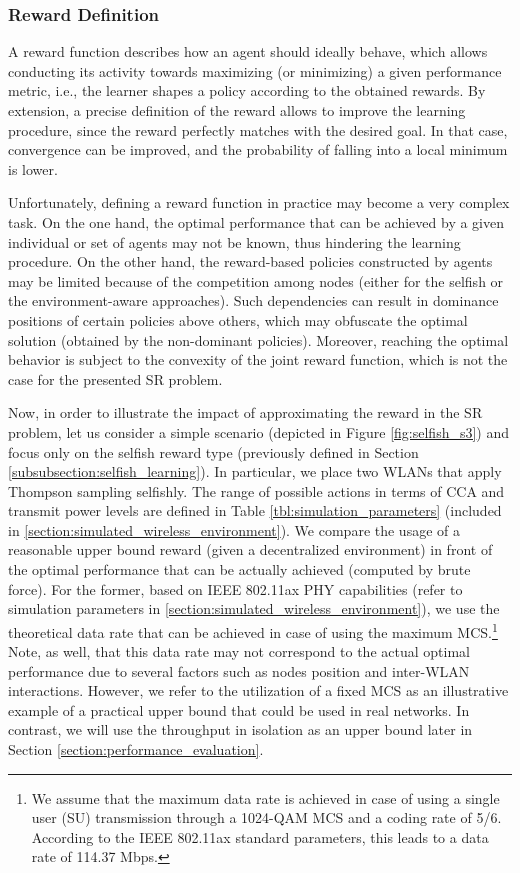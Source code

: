 \documentclass{article}
\begin{document}
\subsubsection{Reward Definition}
\label{subsubsection:reward}
A reward function describes how an agent should ideally behave, which allows conducting its activity towards maximizing (or minimizing) a given performance metric, i.e., the learner shapes a policy according to the obtained rewards. By extension, a precise definition of the reward allows to improve the learning procedure, since the reward perfectly matches with the desired goal. In that case, convergence can be improved, and the probability of falling into a local minimum is lower. 

Unfortunately, defining a reward function in practice may become a very complex task. On the one hand, the optimal performance that can be achieved by a given individual or set of agents may not be known, thus hindering the learning procedure. On the other hand, the reward-based policies constructed by agents may be limited because of the competition among nodes (either for the selfish or the environment-aware approaches). Such dependencies can result in dominance positions of certain policies above others, which may obfuscate the optimal solution (obtained by the non-dominant policies). Moreover, reaching the optimal behavior is subject to the convexity of the joint reward function, which is not the case for the presented SR problem.

Now, in order to illustrate the impact of approximating the reward in the SR problem, let us consider a simple scenario (depicted in Figure \ref{fig:selfish_s3}) and focus only on the selfish reward type (previously defined in Section \ref{subsubsection:selfish_learning}). In particular, we place two WLANs that apply Thompson sampling selfishly. The range of possible actions in terms of CCA and transmit power levels are defined in Table \ref{tbl:simulation_parameters} (included in \ref{section:simulated_wireless_environment}). We compare the usage of a reasonable upper bound reward (given a decentralized environment) in front of the optimal performance that can be actually achieved (computed by brute force). For the former, based on IEEE 802.11ax PHY capabilities (refer to simulation parameters in \ref{section:simulated_wireless_environment}), we use the theoretical data rate that can be achieved in case of using the maximum MCS.\footnote{We assume that the maximum data rate is achieved in case of using a single user (SU) transmission through a 1024-QAM MCS and a coding rate of 5/6. According to the IEEE 802.11ax standard parameters, this leads to a data rate of 114.37 Mbps.} Note, as well, that this data rate may not correspond to the actual optimal performance due to several factors such as nodes position and inter-WLAN interactions. However, we refer to the utilization of a fixed MCS as an illustrative example of a practical upper bound that could be used in real networks. In contrast, we will use the throughput in isolation as an upper bound later in Section \ref{section:performance_evaluation}.
\end{document}
